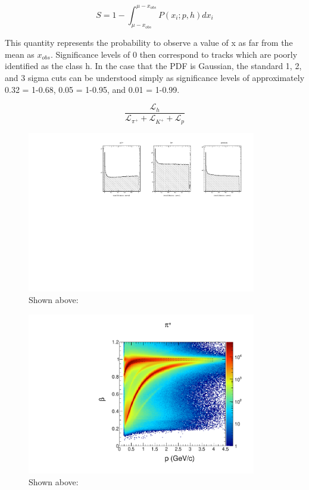 \begin{equation}
  S = 1 - \int_{\mu-x_{obs}}^{\mu-x_{obs}} P(x_i;p,h) dx_i 
\end{equation}

This quantity represents the probability to observe a value of x as far from the mean as $x_{obs}$.  Significance levels of 0 then correspond to tracks which are poorly identified as the class h.  In the case that the PDF is Gaussian, the standard 1, 2, and 3 sigma cuts can be understood simply as significance levels of approximately 0.32 = 1-0.68, 0.05 = 1-0.95, and 0.01 = 1-0.99.

\begin{equation}
  \frac{\mathcal{L}_h}{\mathcal{L}_{\pi^+}+\mathcal{L}_{K^+}+\mathcal{L}_{p}}
\end{equation}

\begin{figure}
  \begin{center}
    \includegraphics[width=10cm]{image/confidence_level.pdf}
    \caption{ Shown above: }
  \end{center}
\end{figure}

\begin{figure}
  \begin{center}
    \includegraphics[width=10cm]{image/beautiful_pbeta_pip.pdf}
    \caption{ Shown above: }
  \end{center}
\end{figure}

